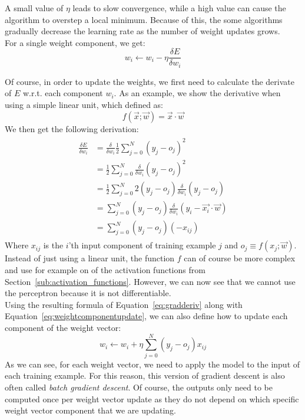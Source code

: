 A small value of $\eta$ leads to slow convergence, while a high value can cause the algorithm to overstep a local minimum. Because of this, the some algorithms gradually decrease the learning rate as the number of weight updates grows.\\
For a single weight component, we get:
\begin{equation}
    \label{eq:weightcomponentupdate}
    w_i \gets w_i - \eta \frac{\delta E}{\delta w_i}
\end{equation}

Of course, in order to update the weights, we first need to calculate the derivate of $E$ w.r.t. each component $w_i$. As an example, we show the derivative when using a simple linear unit, which defined as:
\begin{equation}
    f(\overrightarrow{x};\overrightarrow{w}) = \overrightarrow{x} \cdot \overrightarrow{w}
\end{equation}
We then get the following derivation:
\begin{align}
    \label{eq:gradderiv}
    \begin{split}
        \frac{\delta E}{\delta w_i} &= \frac{\delta}{\delta w_i} \frac{1}{2} \sum_{j=0}^N (y_j - o_j)^2\\
        &= \frac{1}{2} \sum_{j=0}^N \frac{\delta}{\delta w_i} (y_j - o_j)^2\\
        &= \frac{1}{2} \sum_{j=0}^N 2 (y_j - o_j) \frac{\delta}{\delta w_i} (y_j - o_j)\\
        &= \sum_{j=0}^N (y_j - o_j) \frac{\delta}{\delta w_i} (y_i - \overrightarrow{x_i} \cdot \overrightarrow{w})\\
        &= \sum_{j=0}^N (y_j - o_j)(-x_{ij})
    \end{split}
\end{align}
Where $x_{ij}$ is the $i$'th input component of training example $j$ and $o_j \equiv f(x_j; \overrightarrow{w})$. Instead of just using a linear unit, the function $f$ can of course be more complex and use for example on of the activation functions from Section~\ref{sub:activation_functions}. However, we can now see that we cannot use the perceptron because it is not differentiable.\\

Using the resulting formula of Equation~\ref{eq:gradderiv} along with Equation~\ref{eq:weightcomponentupdate}, we can also define how to update each component of the weight vector:
\begin{equation}
    w_i \gets w_i + \eta \sum_{j=0}^N (y_j - o_j)x_{ij}
\end{equation}
As we can see, for each weight vector, we need to apply the model to the input of each training example. For this reason, this version of gradient descent is also often called \textit{batch gradient descent}. Of course, the outputs only need to be computed once per weight vector update as they do not depend on which specific weight vector component that we are updating.\\


